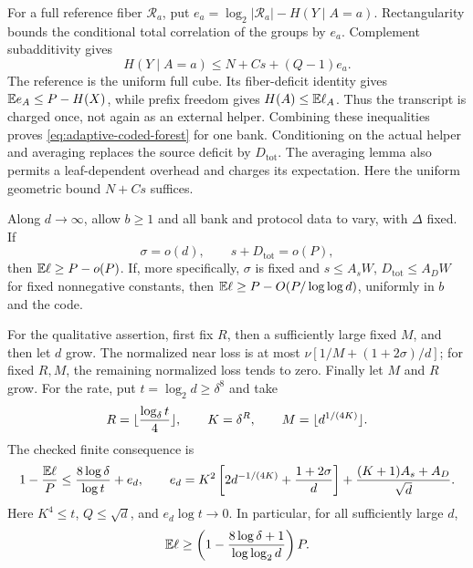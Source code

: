 \begin{proofoutline}
For a full reference fiber $\mathcal R_a$, put
$e_a=\log_2|\mathcal R_a|-H(Y\mid A=a)$. Rectangularity bounds the conditional
total correlation of the groups by $e_a$. Complement subadditivity gives
\[
 H(Y\mid A=a)\le N+Cs+(Q-1)e_a.
\]
The reference is the uniform full cube. Its fiber-deficit identity gives
$\mathbb E e_A\le P-H(X)$, while prefix freedom gives $H(A)\le\mathbb E\ell_A$.
Thus the transcript is charged once, not again as an external helper.
Combining these inequalities proves \eqref{eq:adaptive-coded-forest} for
one bank. Conditioning on the actual helper and averaging replaces the
source deficit by $D_{\mathrm{tot}}$.
The averaging lemma also permits a leaf-dependent overhead and charges its
expectation. Here the uniform geometric bound $N+Cs$ suffices.
\end{proofoutline}

\begin{corollary}\label{cor:adaptive-coded-rate}
Along $d\to\infty$, allow $b\ge1$ and all bank and protocol data to vary,
with $\Delta$ fixed. If
\[
 \sigma=o(d),\qquad s+D_{\mathrm{tot}}=o(P),
\]
then $\mathbb E\ell\ge P-o(P)$. If, more specifically, $\sigma$ is fixed and
$s\le A_sW$, $D_{\mathrm{tot}}\le A_DW$ for fixed nonnegative constants,
then $\mathbb E\ell\ge P-O(P/\log\log d)$, uniformly in $b$ and the code.
\end{corollary}

\begin{proofoutline}
For the qualitative assertion, first fix $R$, then a sufficiently large fixed
$M$, and then let $d$ grow. The normalized near loss is at most
$\nu[1/M+(1+2\sigma)/d]$; for fixed $R,M$, the remaining normalized loss
tends to zero. Finally let $M$ and $R$ grow.
For the rate, put $t=\log_2d\ge\delta^8$ and take
\[
 R=\lfloor\frac{\log_\delta t}{4}\rfloor,\qquad K=\delta^R,
 \qquad M=\lfloor d^{1/(4K)}\rfloor.
\]
The checked finite consequence is
\[
 1-\frac{\mathbb E\ell}{P}\le\frac{8\log\delta}{\log t}+e_d,
 \qquad
 e_d=K^2\left[2d^{-1/(4K)}+\frac{1+2\sigma}{d}\right]
       +\frac{(K+1)A_s+A_D}{\sqrt d}.
\]
Here $K^4\le t$, $Q\le\sqrt d$, and $e_d\log t\to0$. In particular, for all
sufficiently large $d$,
\[
 \mathbb E\ell\ge\left(1-\frac{8\log\delta+1}{\log\log_2d}\right)P.
\]
\end{proofoutline}

